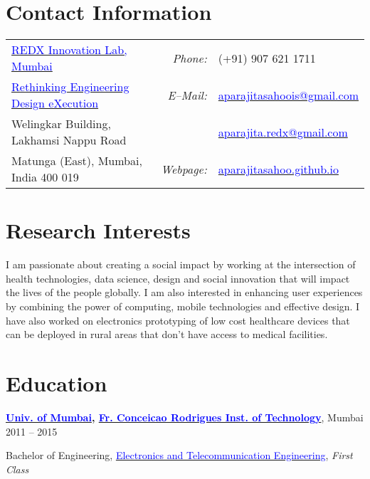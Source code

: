 \documentclass[margin,line]{res}
\newenvironment{list1}{
  \begin{list}{\ding{113}}{%
      \setlength{\itemsep}{0in}
      \setlength{\parsep}{0in} \setlength{\parskip}{0in}
      \setlength{\topsep}{0in} \setlength{\partopsep}{0in} 
      \setlength{\leftmargin}{0.17in}}}{\end{list}}
\begin{document}

\begin{resume}
\section{\sc Contact Information}
\vspace{.05in}
\begin{tabular}{@{}p{2.9in}p{.5in}p{3in}}
\href{https://redxmumbai.com/}{\textcolor{blue} {REDX Innovation Lab, Mumbai}} & \multicolumn{1}{r}{\it Phone:}  &(+91) 907 621 1711 \\           
\href{http://redx.io/}{\textcolor{blue} {Rethinking Engineering Design eXecution}} &\multicolumn{1}{r}{\it E--Mail:}& \href{mailto:aparajitasahoois@gmail.com}{\textcolor{blue}{aparajitasahoois@gmail.com}} \\ 
Welingkar Building, Lakhamsi Nappu Road & & \href{mailto:aparajita.redx@gmail.com}{\textcolor{blue}{aparajita.redx@gmail.com}} \\ 
Matunga (East), Mumbai, India 400 019 & \multicolumn{1}{r}{\it Webpage:} &\href{http://aparajitasahoo.github.io/}{\textcolor{blue}{aparajitasahoo.github.io}} \\     
\end{tabular}

\section{\sc Research Interests}
\lettrine[lines=2]{I}{} am passionate about creating a social impact by working at the intersection of health technologies, data science, design and social innovation that will impact the lives of the people globally. I am also interested in enhancing  user experiences by combining the power of computing, mobile technologies and effective design. I have also worked on electronics prototyping of low cost healthcare devices that can be deployed in rural areas that don’t have access to medical facilities.  

\section{\sc Education}
{\bf \href{http://mu.ac.in/portal/}{\textcolor{blue}{Univ. of Mumbai}}, \href{http://fcrit.ac.in/}{\textcolor{blue}{Fr. Conceicao Rodrigues Inst. of Technology}}}, Mumbai \hfill {2011 -- 2015} \\
\vspace*{-.15in}
\begin{list1}
\item[] Bachelor of Engineering, \href{http://www.extc.fcrit.ac.in/}{\textcolor{blue}{Electronics and Telecommunication Engineering}}, \textit{First Class}
\end{list1}


\end{resume}
\end{document}
